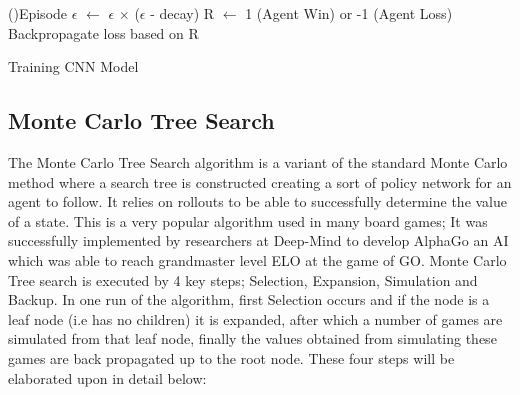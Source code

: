 \documentclass[a4paper,12pt,table]{article}
\begin{document}
\begin{algorithm}[H]
    \SetAlgoLined
    \ForEach(){Episode}{
            $\epsilon$ $\leftarrow$ $\epsilon$ $\times$ ($\epsilon$ - decay)\;
            R $\leftarrow$ 1 (Agent Win) or -1 (Agent Loss)\;
            Backpropagate loss based on R\;          
    }
    \caption{Training CNN Model}
\end{algorithm}

\subsection{Monte Carlo Tree Search}
The Monte Carlo Tree Search algorithm is a variant of the standard Monte Carlo method where a search tree is constructed creating a sort of policy network for an agent to follow. It relies on rollouts to be able to successfully determine the value of a state. This is a very popular algorithm used in many board games; It was successfully implemented by researchers at Deep-Mind to develop AlphaGo an AI which was able to reach grandmaster level ELO at the game of GO. Monte Carlo Tree search is executed by 4 key steps; Selection, Expansion, Simulation and Backup. In one run of the algorithm, first Selection occurs and if the node is a leaf node (i.e has no children) it is expanded, after which a number of games are simulated from that leaf node, finally the values obtained from simulating these games are back propagated up to the root node. These four steps will be elaborated upon in detail below:
\end{document}
